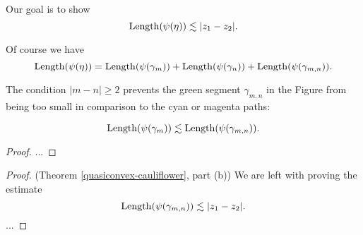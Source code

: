 Our goal is to show 
\begin{equation} \label{quasiconvexity goal}
\operatorname{Length}(\psi(\eta)) \lesssim |z_1-z_2|.
\end{equation}


Of course we have
\begin{equation}
	\operatorname{Length}(\psi(\eta))=\operatorname{Length}(\psi(\gamma_m))+\operatorname{Length}(\psi(\gamma_n))+\operatorname{Length}(\psi(\gamma_{m,n})).
\end{equation}


The condition $|m-n| \geq 2$ prevents the green segment $\gamma _{m,n}$ in the Figure from being too small in comparison to the cyan or magenta paths:
\begin{proposition}
\begin{equation}
	\operatorname{Length}(\psi(\gamma_m)) \lesssim \operatorname{Length}(\psi(\gamma_{m,n})).
\end{equation}
\end{proposition}
\begin{proof}
...
\end{proof}


\begin{proof}(Theorem \ref{quasiconvex-cauliflower}, part (b))
	We are left with proving the estimate 
	\begin{equation}
		\operatorname{Length}(\psi(\gamma_{m,n})) \lesssim |z_1-z_2|.
	\end{equation}
	...
\end{proof}


